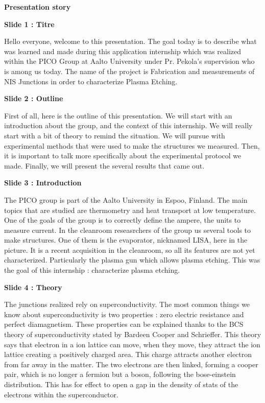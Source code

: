 \documentclass[a4paper,11pt]{article}
\begin{document}
\begin{center}
    {\Large \textbf{Presentation story}}
\end{center}

{\Large \textbf{Slide 1 : Titre}}

Hello everyone, welcome to this presentation. The goal today is to describe what was learned and made during this application internship which was realized within the PICO Group at Aalto University under Pr. Pekola's supervision who is  among us today. The name of the project is Fabrication and measurements of NIS Junctions in order to characterize Plasma Etching.
\medbreak

{\Large \textbf{Slide 2 : Outline}}

First of all, here is the outline of this presentation. We will start with an introduction about the group, and the context of this internship. We will really start with a bit of theory to remind the situation. We will pursue with experimental methods that were used to make the structures we measured. Then, it is important to talk more specifically about the experimental protocol we made. Finally, we will present the several results that came out.
\medbreak

{\Large \textbf{Slide 3 : Introduction}}

The PICO group is part of the Aalto University in Espoo, Finland. The main topics that are studied are thermometry and heat transport at low temperature. One of the goals of the group is to correctly define the ampere, the units to measure current. In the cleanroom reseasrchers of the group us several tools to make structures. One of them is the evaporator, nicknamed LISA, here in the picture. It is a recent acquisition in the cleanroom, so all its features are not yet characterized. Particularly the plasma gun which allows plasma etching. This was the goal of this internship : characterize plasma etching.
\medbreak 

{\Large \textbf{Slide 4 : Theory}}

The junctions realized rely on superconductivity. The most common things we know about superconductivity is two properties : zero electric resistance and perfect diamagnetism. These properties can be explained thanks to the BCS theory of superconductivity stated by Bardeen Cooper and Schrieffer. This theory says that electron in a ion lattice can move, when they move, they attract the ion lattice creating a positively charged area. This charge attracts another electron from far away in the matter. The two electrons are then linked, forming a cooper pair, which is no longer a fermion but a boson, following the bose-einstein distribution. This has for effect to open a gap in the density of stats of the electrons within the superconductor.
\medbreak
\end{document}
